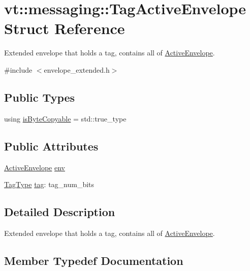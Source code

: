 \hypertarget{structvt_1_1messaging_1_1_tag_active_envelope}{}\section{vt\+:\+:messaging\+:\+:Tag\+Active\+Envelope Struct Reference}
\label{structvt_1_1messaging_1_1_tag_active_envelope}


Extended envelope that holds a tag, contains all of {\ttfamily \hyperlink{structvt_1_1messaging_1_1_active_envelope}{Active\+Envelope}}.  




{\ttfamily \#include $<$envelope\+\_\+extended.\+h$>$}

\subsection*{Public Types}
\begin{DoxyCompactItemize}
\item 
using \hyperlink{structvt_1_1messaging_1_1_tag_active_envelope_a25b95de57b90351e8b017ea2742eadc2}{is\+Byte\+Copyable} = std\+::true\+\_\+type
\end{DoxyCompactItemize}
\subsection*{Public Attributes}
\begin{DoxyCompactItemize}
\item 
\hyperlink{structvt_1_1messaging_1_1_active_envelope}{Active\+Envelope} \hyperlink{structvt_1_1messaging_1_1_tag_active_envelope_a407d7bb06664c813df052dac889f8f3a}{env}
\item 
\hyperlink{namespacevt_a84ab281dae04a52a4b243d6bf62d0e52}{Tag\+Type} \hyperlink{structvt_1_1messaging_1_1_tag_active_envelope_ab5fdfcb898f8e0ca0b5c580018824766}{tag}\+: tag\+\_\+num\+\_\+bits
\end{DoxyCompactItemize}


\subsection{Detailed Description}
Extended envelope that holds a tag, contains all of {\ttfamily \hyperlink{structvt_1_1messaging_1_1_active_envelope}{Active\+Envelope}}. 

\subsection{Member Typedef Documentation}
\mbox{\label{structvt_1_1messaging_1_1_tag_active_envelope_a25b95de57b90351e8b017ea2742eadc2}} 
